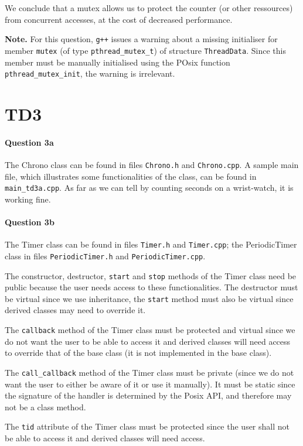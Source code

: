\documentclass[a4paper,oneside,11pt]{article}
\begin{document}
We conclude that a mutex allows us to protect the counter (or other ressources) from concurrent accesses, at the cost of decreased performance.

\textbf{Note.} For this question, \texttt{g++} issues a warning about a missing initialiser for member \texttt{mutex} (of type \texttt{pthread\_mutex\_t}) of structure \texttt{ThreadData}. Since this member must be manually initialised using the POsix function \texttt{pthread\_mutex\_init}, the warning is irrelevant.

\section*{TD3}
\paragraph{Question 3a} The Chrono class can be found in files \texttt{Chrono.h} and \texttt{Chrono.cpp}. A sample main file, which illustrates some functionalities of the class, can be found in \texttt{main\_td3a.cpp}. As far as we can tell by counting seconds on a wrist-watch, it is working fine.

\paragraph{Question 3b} The Timer class can be found in files \texttt{Timer.h} and \texttt{Timer.cpp}; the PeriodicTimer class in files \texttt{PeriodicTimer.h} and \texttt{PeriodicTimer.cpp}.

The constructor, destructor, \texttt{start} and \texttt{stop} methods of the Timer class need be public because the user needs access to these functionalities. The destructor must be virtual since we use inheritance, the \texttt{start} method must also be virtual since derived classes may need to override it.

The \texttt{callback} method of the Timer class must be protected and virtual since we do not want the user to be able to access it and derived classes will need access to override that of the base class (it is not implemented in the base class).

The \texttt{call\_callback} method of the Timer class must be private (since we do not want the user to either be aware of it or use it manually). It must be static since the signature of the handler is determined by the Posix API, and therefore may not be a class method.

The \texttt{tid} attribute of the Timer class must be protected since the user shall not be able to access it and derived classes will need access.
\end{document}
